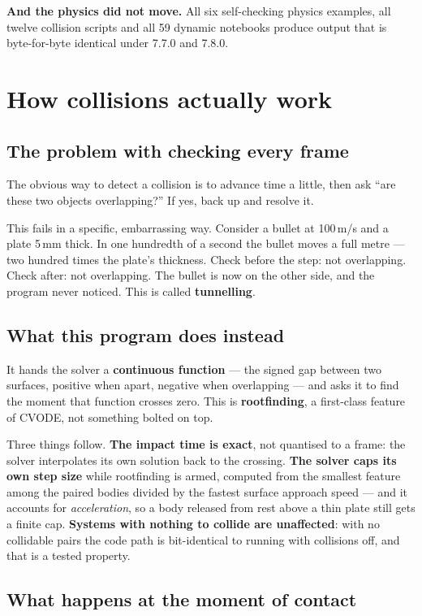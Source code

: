\documentclass[11pt]{article}
\begin{document}
\textbf{And the physics did not move.} All six self-checking physics
examples, all twelve collision scripts and all 59 dynamic notebooks
produce output that is byte-for-byte identical under 7.7.0 and 7.8.0.

\section{How collisions actually work}

\subsection{The problem with checking every frame}

The obvious way to detect a collision is to advance time a little, then
ask ``are these two objects overlapping?'' If yes, back up and resolve
it.

This fails in a specific, embarrassing way. Consider a bullet at
100\,m/s and a plate 5\,mm thick. In one hundredth of a second the
bullet moves a full metre --- two hundred times the plate's thickness.
Check before the step: not overlapping. Check after: not overlapping.
The bullet is now on the other side, and the program never noticed. This
is called \textbf{tunnelling}.

\subsection{What this program does instead}

It hands the solver a \textbf{continuous function} --- the signed gap
between two surfaces, positive when apart, negative when overlapping ---
and asks it to find the moment that function crosses zero. This is
\textbf{rootfinding}, a first-class feature of CVODE, not something
bolted on top.

Three things follow. \textbf{The impact time is exact}, not quantised to
a frame: the solver interpolates its own solution back to the crossing.
\textbf{The solver caps its own step size} while rootfinding is armed,
computed from the smallest feature among the paired bodies divided by
the fastest surface approach speed --- and it accounts for
\emph{acceleration}, so a body released from rest above a thin plate
still gets a finite cap. \textbf{Systems with nothing to collide are
unaffected}: with no collidable pairs the code path is bit-identical to
running with collisions off, and that is a tested property.

\subsection{What happens at the moment of contact}
\end{document}
